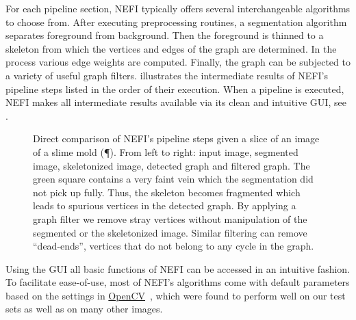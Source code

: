 	For each pipeline section, NEFI typically offers several interchangeable algorithms to choose from. After executing preprocessing routines, a segmentation algorithm separates foreground from background. Then the foreground is thinned to a skeleton from which the vertices and edges of the graph are determined. In the process various edge weights are computed. Finally, the graph can be subjected to a variety of useful graph filters.  illustrates the intermediate results of NEFI's pipeline steps listed in the order of their execution. When a pipeline is executed, NEFI makes all intermediate results available via its clean and intuitive GUI, see . 

	\begin{figure}
		\centering
		\caption[NEFI's pipeline executed]{Direct comparison of NEFI's pipeline steps given a slice of an image of a slime mold (\P). From left to right: input image, segmented image, skeletonized image, detected graph and filtered graph. The green square contains a very faint vein which the segmentation did not pick up fully. Thus, the skeleton becomes fragmented which leads to spurious vertices in the detected graph. By applying a graph filter we remove stray vertices without manipulation of the segmented or the skeletonized image. Similar filtering can remove ``dead-ends'', \ie vertices that do not belong to any cycle in the graph.}
		\label{fig:pipeline}
	\end{figure}

	Using the GUI all basic functions of NEFI can be accessed in an intuitive fashion. To facilitate ease-of-use, most of NEFI's algorithms come with default parameters based on the settings in \href{http://opencv.org/}{OpenCV}~\cite{opencv}, which were found to perform well on our test sets as well as on many other images.

